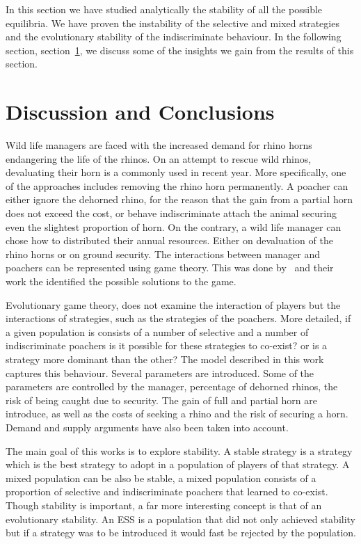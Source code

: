 \documentclass[10pt]{article}
\begin{document}
In this section we have studied analytically the stability of all the possible
equilibria. We have proven the instability of the selective and mixed strategies
and the evolutionary stability of the indiscriminate behaviour. In the following
section, section~\ref{section:discussion}, we discuss some of the insights we
gain from the results of this section.

\section{Discussion and Conclusions}
\label{section:discussion}

Wild life managers are faced with the increased demand for rhino horns endangering
the life of the rhinos. On an attempt to rescue wild rhinos, devaluating their horn
is a commonly used in recent year.  More specifically, one of the approaches 
includes removing the rhino horn permanently.  A poacher can either
ignore the dehorned rhino, for the reason that the gain from a partial horn does
not exceed the cost, or behave indiscriminate attach the animal securing even
the slightest proportion of horn.  On the contrary, a wild
life manager can chose how to distributed their annual resources. Either
on devaluation of the rhino horns or on ground security. The interactions
between manager and poachers can be represented using game theory. This
was done by~\cite{Lee} and their work the identified the possible solutions
to the game.

Evolutionary game theory, does not examine the interaction of players but the
interactions of strategies, such as the strategies of the poachers. More detailed,
if a given population is consists of a number of selective and a number of 
indiscriminate poachers is it possible for these strategies to co-exist? or 
is a strategy more dominant than the other? The model described in this
work captures this behaviour.  Several parameters are introduced. Some of
the parameters are controlled by the manager, percentage of dehorned rhinos,
the risk of being caught due to security. The gain of full and partial horn are
introduce, as well as the costs of seeking a rhino and the risk of securing 
a horn.  Demand and supply arguments have also been taken into account.

The main goal of this works is to explore stability. A stable strategy is a strategy
which is the best strategy to adopt in a population of players of that strategy. A mixed
population can be also be stable, a mixed population consists of a proportion
of selective and indiscriminate poachers that learned to co-exist. Though stability
is important, a far more interesting concept is that of an evolutionary stability.
An  ESS is a population that did not only achieved stability but  if a strategy
was to be introduced it would fast be rejected by the population.  
\end{document}

